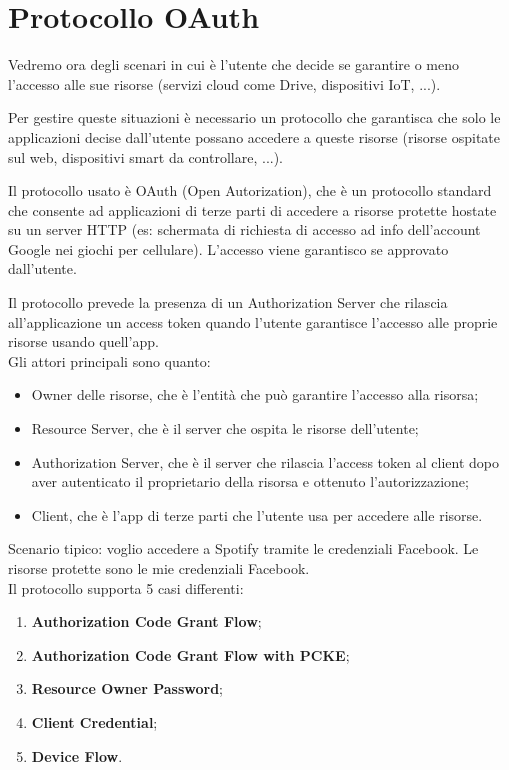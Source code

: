 \chapter{Protocollo OAuth}
Vedremo ora degli scenari in cui è l'utente che decide se garantire o meno l'accesso alle sue risorse (servizi cloud come Drive, dispositivi IoT, ...).

Per gestire queste situazioni è necessario un protocollo che garantisca che solo le applicazioni decise dall'utente possano accedere a queste risorse (risorse ospitate sul web, dispositivi smart da controllare, ...).

Il protocollo usato è OAuth (Open Autorization), che è un protocollo standard che consente ad applicazioni di terze parti di accedere a risorse protette hostate su un server HTTP (es: schermata di richiesta di accesso ad info dell'account Google nei giochi per cellulare). L'accesso viene garantisco se approvato dall'utente.

Il protocollo prevede la presenza di un Authorization Server che rilascia all'applicazione un access token quando l'utente garantisce l'accesso alle proprie risorse usando quell'app.
\\

\noindent Gli attori principali sono quanto:
\begin{itemize}
    \item Owner delle risorse, che è l'entità che può garantire l'accesso alla risorsa;
    \item Resource Server, che è il server che ospita le risorse dell'utente;
    \item Authorization Server, che è il server che rilascia l'access token al client dopo aver autenticato il proprietario della risorsa e ottenuto l'autorizzazione;
    \item Client, che è l'app di terze parti che l'utente usa per accedere alle risorse.
\end{itemize}

\noindent Scenario tipico: voglio accedere a Spotify tramite le credenziali Facebook. Le risorse protette sono le mie credenziali Facebook.
\\

\noindent Il protocollo supporta 5 casi differenti:
\begin{enumerate}
    \item \textbf{Authorization Code Grant Flow};
    \item \textbf{Authorization Code Grant Flow with PCKE};
    \item \textbf{Resource Owner Password};
    \item \textbf{Client Credential};
    \item \textbf{Device Flow}.
\end{enumerate}

